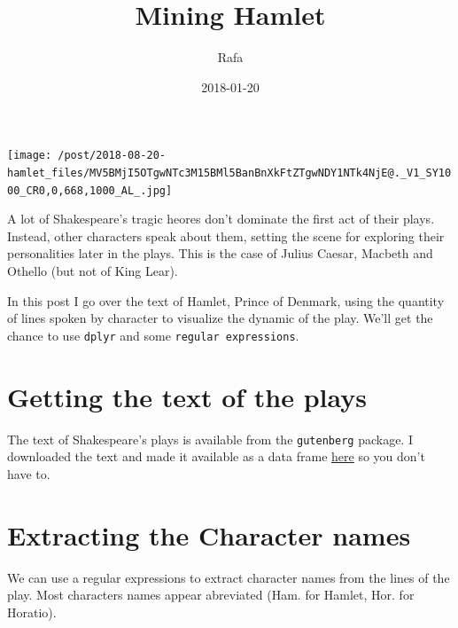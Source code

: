 \documentclass[]{article}
\title{Mining Hamlet}
\author{Rafa}
\date{2018-01-20}
\newenvironment{Shaded}{\begin{snugshade}}{\end{snugshade}}
\newcommand{\KeywordTok}[1]{\textcolor[rgb]{0.13,0.29,0.53}{\textbf{#1}}}
\newcommand{\NormalTok}[1]{#1}
\newcommand{\OperatorTok}[1]{\textcolor[rgb]{0.81,0.36,0.00}{\textbf{#1}}}
\newcommand{\StringTok}[1]{\textcolor[rgb]{0.31,0.60,0.02}{#1}}
\begin{document}
\maketitle

\texttt{[image: /post/2018-08-20-hamlet\_files/MV5BMjI5OTgwNTc3M15BMl5BanBnXkFtZTgwNDY1NTk4NjE@.\_V1\_SY1000\_CR0,0,668,1000\_AL\_.jpg]}

A lot of Shakespeare's tragic heores don't dominate the first act of
their plays. Instead, other characters speak about them, setting the
scene for exploring their personalities later in the plays. This is the
case of Julius Caesar, Macbeth and Othello (but not of King Lear).

In this post I go over the text of Hamlet, Prince of Denmark, using the
quantity of lines spoken by character to visualize the dynamic of the
play. We'll get the chance to use \texttt{dplyr} and some
\texttt{regular\ expressions}.

\hypertarget{getting-the-text-of-the-plays}{%
\section{Getting the text of the
plays}\label{getting-the-text-of-the-plays}}

The text of Shakespeare's plays is available from the \texttt{gutenberg}
package. I downloaded the text and made it available as a data frame
\href{/post/2018-08-20-hamlet_files/shakespeare_plays.rds}{here} so you
don't have to.

\begin{Shaded}
\end{Shaded}

\hypertarget{extracting-the-character-names}{%
\section{Extracting the Character
names}\label{extracting-the-character-names}}

We can use a regular expressions to extract character names from the
lines of the play. Most characters names appear abreviated (Ham. for
Hamlet, Hor. for Horatio).
\end{document}

